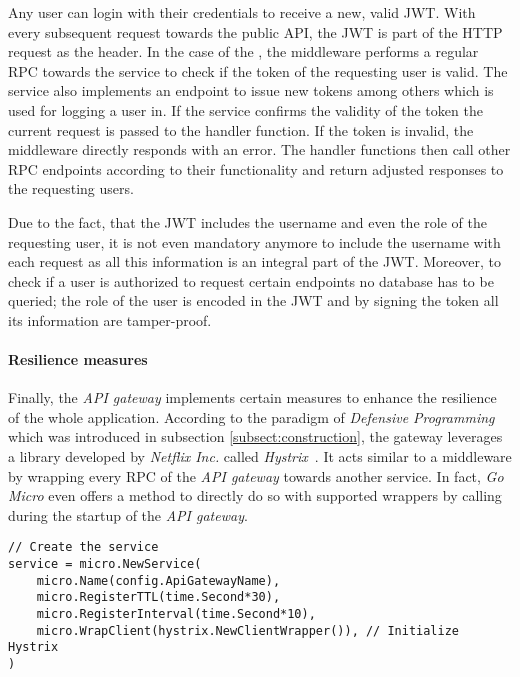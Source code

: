 \documentclass[12pt,a4paper,twoside]{report}
\begin{document}
Any user can login with their credentials to receive a new, valid JWT.
With every subsequent request towards the public API, the JWT is part of the
HTTP request as the  header.
In the case of the , the middleware performs
a regular RPC towards the  service to check if the
token of the requesting user is valid. The  service also
implements an endpoint to issue new tokens among others which is used for logging
a user in.
If the service confirms the validity of the token the current request is passed
to the handler function. If the token is invalid, the middleware directly responds
with an error.
The handler functions then call other RPC endpoints according to their functionality
and return adjusted responses to the requesting users.

Due to the fact, that the JWT includes the username and even the role of the
requesting user, it is not even mandatory anymore to include the username with
each request as all this information is an integral part of the JWT.
Moreover, to check if a user is authorized to request certain endpoints no
database has to be queried; the role of the user is encoded in the JWT and
by signing the token all its information are tamper-proof.

\paragraph{Resilience measures}
Finally, the \textit{API gateway} implements certain measures to enhance
the resilience of the whole application.
According to the paradigm of \textit{Defensive Programming} which was introduced
in subsection \ref{subsect:construction}, the gateway leverages a library
developed by \textit{Netflix Inc.} called \textit{Hystrix}~\cite{hystrix}.
It acts similar to a middleware by wrapping every RPC of the
\textit{API gateway} towards another service.
In fact, \textit{Go Micro} even offers a method to directly do so with
supported wrappers by calling  during the startup
of the \textit{API gateway}.

\begin{lstlisting}[title=api-gateway/main.go]
// Create the service
service = micro.NewService(
	micro.Name(config.ApiGatewayName),
	micro.RegisterTTL(time.Second*30),
	micro.RegisterInterval(time.Second*10),
	micro.WrapClient(hystrix.NewClientWrapper()), // Initialize Hystrix
)
\end{lstlisting}
\end{document}
